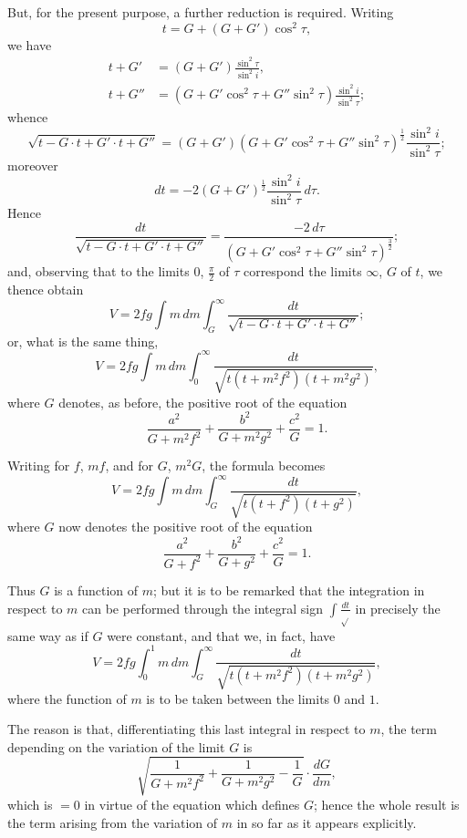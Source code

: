 \documentclass[11pt,a4paper]{book}
\begin{document}
\begin{art}
But, for the present purpose, a further reduction is required. Writing
\[ t = G + (G + G')\cos^2\tau, \]
we have
\begin{align*}
t + G' &= (G + G')\frac{\sin^2\tau}{\sin^2 i}, \\
t + G'' &= (G + G'\cos^2\tau + G''\sin^2\tau)\frac{\sin^2 i}{\sin^2\tau};
\end{align*}
whence
\[
\sqrt{t - G \cdot t + G' \cdot t + G''} = (G + G')(G + G'\cos^2\tau + G''\sin^2\tau)^{\frac{1}{2}}\frac{\sin^2 i}{\sin^2\tau};
\]
moreover
\[ dt = -2(G + G')^{\frac{1}{2}}\frac{\sin^2 i}{\sin^2\tau}\,d\tau. \]
Hence
\[
\frac{dt}{\sqrt{t - G \cdot t + G' \cdot t + G''}} = \frac{-2\,d\tau}{(G + G'\cos^2\tau + G''\sin^2\tau)^{\frac{3}{2}}};
\]
and, observing that to the limits $0$, $\frac{\pi}{2}$ of $\tau$ correspond the limits $\infty$, $G$ of $t$, we thence obtain
\[
V = 2fg\int m\,dm\int_G^{\infty} \frac{dt}{\sqrt{t - G \cdot t + G' \cdot t + G''}};
\]
or, what is the same thing,
\[
V = 2fg\int m\,dm\int_0^{\infty} \frac{dt}{\sqrt{t(t + m^2f^2)(t + m^2g^2)}},
\]
where $G$ denotes, as before, the positive root of the equation
\[
\frac{a^2}{G + m^2f^2} + \frac{b^2}{G + m^2g^2} + \frac{c^2}{G} = 1.
\]
\end{art}

\begin{art}
Writing for $f$, $mf$, and for $G$, $m^2G$, the formula becomes
\[
V = 2fg\int m\,dm\int_G^{\infty} \frac{dt}{\sqrt{t(t + f^2)(t + g^2)}},
\]
where $G$ now denotes the positive root of the equation
\[
\frac{a^2}{G + f^2} + \frac{b^2}{G + g^2} + \frac{c^2}{G} = 1.
\]
\end{art}

\begin{art}
Thus $G$ is a function of $m$; but it is to be remarked that the integration in respect to $m$ can be performed through the integral sign $\int\frac{dt}{\sqrt{}}$ in precisely the same way as if $G$ were constant, and that we, in fact, have
\[
V = 2fg\int_0^1 m\,dm\int_G^{\infty} \frac{dt}{\sqrt{t(t + m^2f^2)(t + m^2g^2)}},
\]
where the function of $m$ is to be taken between the limits $0$ and $1$.

The reason is that, differentiating this last integral in respect to $m$, the term depending on the variation of the limit $G$ is
\[
\sqrt{\frac{1}{G + m^2f^2} + \frac{1}{G + m^2g^2} - \frac{1}{G}} \cdot \frac{dG}{dm},
\]
which is $=0$ in virtue of the equation which defines $G$; hence the whole result is the term arising from the variation of $m$ in so far as it appears explicitly.
\end{art}
\end{document}
